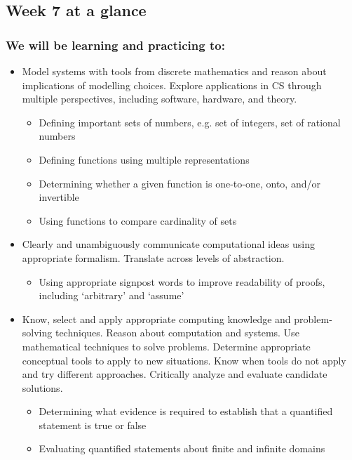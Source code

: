 \documentclass[12pt, oneside]{article}
\begin{document}
\begin{flushright}
\end{flushright} 
\subsection*{Week 7 at a glance}

\subsubsection*{We will be learning and practicing to:}
\begin{itemize}
\item Model systems with tools from discrete mathematics and reason about implications of modelling choices. Explore applications in CS through multiple perspectives, including software, hardware, and theory.
\begin{itemize}
    \item Defining important sets of numbers, e.g. set of integers, set of rational numbers
    \item Defining functions using multiple representations
    \item Determining whether a given function is one-to-one, onto, and/or invertible
    \item Using functions to compare cardinality of sets
\end{itemize}

\item Clearly and unambiguously communicate computational ideas using appropriate formalism. Translate across levels of abstraction.
\begin{itemize}
    \item Using appropriate signpost words to improve readability of proofs, including `arbitrary' and `assume'
\end{itemize}

\item Know, select and apply appropriate computing knowledge and problem-solving techniques. Reason about computation and systems. Use mathematical techniques to solve problems. Determine appropriate conceptual tools to apply to new situations. Know when tools do not apply and try different approaches. Critically analyze and evaluate candidate solutions.
\begin{itemize}
    \item Determining what evidence is required to establish that a quantified statement is true or false
    \item Evaluating quantified statements about finite and infinite domains
\end{itemize}


\end{itemize}
\end{document}
